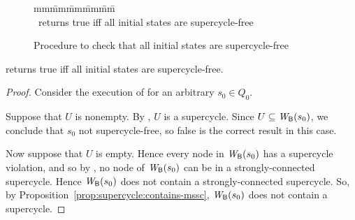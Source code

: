 



\begin{figure}[ht]
\setcounter{lctr}{0}
\begin{tabbing}\label{alg:compute-scViol}
mm\= mm\= mm\= mm\= mm\=\kill
{}\\
\cmnt\ returns true iff all initial states are supercycle-free\\
\lion{\ELSE\ \RETURNE{\ttt}}
\end{tabbing}
\caption{Procedure to check that all initial states are supercycle-free}
\label{fig:checkInitSCFree}
\end{figure}


\begin{proposition}
 returns true iff all initial states are supercycle-free.
\end{proposition}
%
\begin{proof}
Consider the execution of  for an arbitrary $s_0 \in Q_0$.

Suppose that $U$ is nonempty. 
By , $U$ is a supercycle. 
Since $U \subseteq \mathit{W}_{\mathsf{B}}({s_0})$, we conclude that $s_0$ not supercycle-free, so false is the correct
result in this case.

Now suppose that $U$ is empty. Hence every node in $\mathit{W}_{\mathsf{B}}({s_0})$ has a supercycle violation, and so
by , no node of $\mathit{W}_{\mathsf{B}}({s_0})$ can be in a 
strongly-connected supercycle. Hence  $\mathit{W}_{\mathsf{B}}({s_0})$ does not contain a strongly-connected supercycle.
So, by Proposition~\ref{prop:supercycle:contains-mssc}, $\mathit{W}_{\mathsf{B}}({s_0})$ does not contain a supercycle.
\end{proof}
